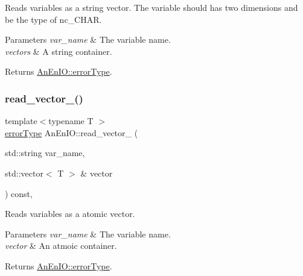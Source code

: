 Reads variables as a string vector. The variable should has two dimensions and be the type of nc\+\_\+\+C\+H\+AR.


\begin{DoxyParams}{Parameters}
{\em var\+\_\+name} & The variable name. \\
\hline
{\em vectors} & A string container. \\
\hline
\end{DoxyParams}
\begin{DoxyReturn}{Returns}
\mbox{\hyperlink{class_an_en_i_o_aa56bc1ec6610b86db4349bce20f9ead0}{An\+En\+I\+O\+::error\+Type}}. 
\end{DoxyReturn}
\mbox{\label{class_an_en_i_o_a3c3a3f86f90ea7610e086d371414d54f}} 
\subsubsection{\texorpdfstring{read\+\_\+vector\+\_\+()}{read\_vector\_()}}
{\footnotesize\ttfamily template$<$typename T $>$ \\
\mbox{\hyperlink{class_an_en_i_o_aa56bc1ec6610b86db4349bce20f9ead0}{error\+Type}} An\+En\+I\+O\+::read\+\_\+vector\+\_\+ (\begin{DoxyParamCaption}\item[{std\+::string}]{var\+\_\+name,  }\item[{std\+::vector$<$ T $>$ \&}]{vector }\end{DoxyParamCaption}) const\hspace{0.3cm}{\ttfamily [inline]}, {\ttfamily [protected]}}

Reads variables as a atomic vector.


\begin{DoxyParams}{Parameters}
{\em var\+\_\+name} & The variable name. \\
\hline
{\em vector} & An atmoic container. \\
\hline
\end{DoxyParams}
\begin{DoxyReturn}{Returns}
\mbox{\hyperlink{class_an_en_i_o_aa56bc1ec6610b86db4349bce20f9ead0}{An\+En\+I\+O\+::error\+Type}}. 
\end{DoxyReturn}
\mbox{\label{class_an_en_i_o_a84b3e8dcfd3176b4ba20c5ff1b17ee85}} 
